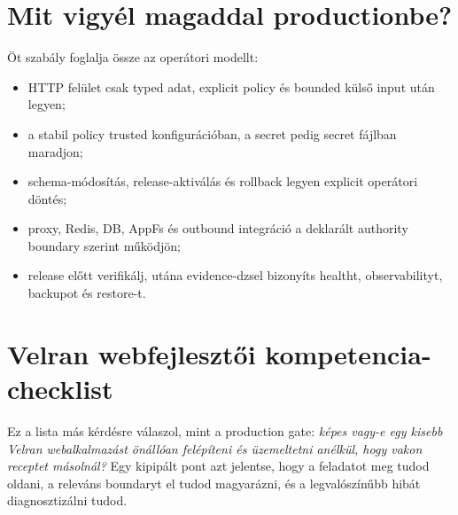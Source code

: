 \section{Mit vigyél magaddal productionbe?}

Öt szabály foglalja össze az operátori modellt:

\begin{itemize}
  \item HTTP felület csak typed adat, explicit policy és bounded külső input után legyen;
  \item a stabil policy trusted konfigurációban, a secret pedig secret fájlban maradjon;
  \item schema-módosítás, release-aktiválás és rollback legyen explicit operátori döntés;
  \item proxy, Redis, DB, AppFs és outbound integráció a deklarált authority boundary szerint működjön;
  \item release előtt verifikálj, utána evidence-dzsel bizonyíts healtht, observabilityt, backupot és restore-t.
\end{itemize}

\section{Velran webfejlesztői kompetencia-checklist}

Ez a lista más kérdésre válaszol, mint a production gate: \emph{képes vagy-e egy kisebb Velran webalkalmazást önállóan felépíteni és üzemeltetni anélkül, hogy vakon receptet másolnál?} Egy kipipált pont azt jelentse, hogy a feladatot meg tudod oldani, a releváns boundaryt el tudod magyarázni, és a legvalószínűbb hibát diagnosztizálni tudod.

